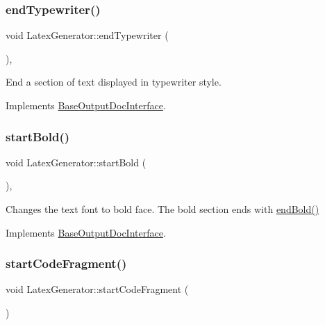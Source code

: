 \subsubsection{\texorpdfstring{endTypewriter()}{endTypewriter()}}
{\footnotesize\ttfamily void Latex\+Generator\+::end\+Typewriter (\begin{DoxyParamCaption}{ }\end{DoxyParamCaption})\hspace{0.3cm}{\ttfamily [inline]}, {\ttfamily [virtual]}}

End a section of text displayed in typewriter style. 

Implements \mbox{\hyperlink{class_base_output_doc_interface_a9e987baf8aed76f0e5e6676b3238d2c8}{Base\+Output\+Doc\+Interface}}.

\mbox{\label{class_latex_generator_a48859c667b43515483f4adb04f46cf0e}} 
\subsubsection{\texorpdfstring{startBold()}{startBold()}}
{\footnotesize\ttfamily void Latex\+Generator\+::start\+Bold (\begin{DoxyParamCaption}{ }\end{DoxyParamCaption})\hspace{0.3cm}{\ttfamily [inline]}, {\ttfamily [virtual]}}

Changes the text font to bold face. The bold section ends with \mbox{\hyperlink{class_latex_generator_ae2336bd8bc8ca0802fb94ff6953e7779}{end\+Bold()}} 

Implements \mbox{\hyperlink{class_base_output_doc_interface_aa0bfe5ef08077a7191ba4666f47c441b}{Base\+Output\+Doc\+Interface}}.

\mbox{\label{class_latex_generator_a4fc23629424d5f2bb82f87d2d0311361}} 
\subsubsection{\texorpdfstring{startCodeFragment()}{startCodeFragment()}}
{\footnotesize\ttfamily void Latex\+Generator\+::start\+Code\+Fragment (\begin{DoxyParamCaption}{ }\end{DoxyParamCaption})\hspace{0.3cm}{\ttfamily [virtual]}}

